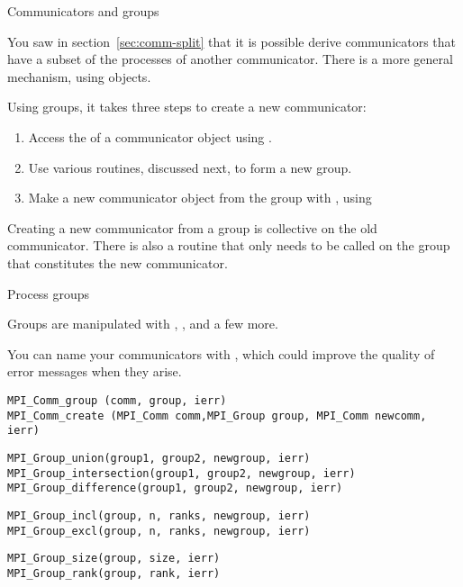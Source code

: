 
 {Communicators and groups}

You saw in section~\ref{sec:comm-split} that it is possible derive
communicators that have a subset of the processes of another communicator.
There is a more general mechanism, using 
objects.

Using groups, it takes three steps to create a new communicator:
\begin{enumerate}
\item Access the  of a communicator
  object using .
\item Use various routines, discussed next, to form a new group.
\item Make a new communicator object from the group with
  , using
\end{enumerate}

Creating a new communicator from a group is collective on the old communicator.
There is also a routine  that only
needs to be called on the group that constitutes the new communicator.

 {Process groups}
\label{sec:comm-group}

Groups are manipulated with
, ,
 and a few more.

You can name your communicators with , which
could improve the quality of error messages when they arise.

\begin{lstlisting}
MPI_Comm_group (comm, group, ierr)
MPI_Comm_create (MPI_Comm comm,MPI_Group group, MPI_Comm newcomm, ierr)
\end{lstlisting}

\begin{lstlisting}
MPI_Group_union(group1, group2, newgroup, ierr)
MPI_Group_intersection(group1, group2, newgroup, ierr)
MPI_Group_difference(group1, group2, newgroup, ierr)
\end{lstlisting}

\begin{lstlisting}
MPI_Group_incl(group, n, ranks, newgroup, ierr)
MPI_Group_excl(group, n, ranks, newgroup, ierr)
\end{lstlisting}
\begin{lstlisting}
MPI_Group_size(group, size, ierr)
MPI_Group_rank(group, rank, ierr)
\end{lstlisting}

